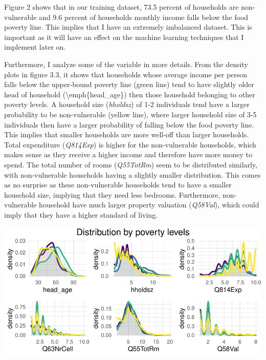 \documentclass[11pt,preprint, authoryear]{elsarticle}
\let\origfigure\figure
\let\endorigfigure\endfigure
\renewenvironment{figure}[1][2] {
    \expandafter\origfigure\expandafter[H]
} {
    \endorigfigure
}
\numberwithin{equation}{section}
\numberwithin{figure}{section}
\numberwithin{table}{section}
\begin{document}
Figure 2 shows that in our training dataset, 73.5 percent of households
are non-vulnerable and 9.6 percent of households monthly income falls
below the food poverty line. This implies that I have an extremely
imbalanced dataset. This is important as it will have an effect on the
machine learning techniques that I implement later on.

Furthermore, I analyze some of the variable in more details. From the
density plots in figure 3.3, it shows that households whose average
income per person falls below the upper-bound poverty line (green line)
tend to have slightly older head of household
(\textbackslash emph\{head\_age\}) then those household belonging to
other poverty levels. A household size (\emph{hholdsz}) of 1-2
individuals tend have a larger probability to be non-vulnerable (yellow
line), where larger household size of 3-5 individuals then have a larger
probability of falling below the food poverty line. This implies that
smaller households are more well-off than larger households. Total
expenditure (\emph{Q814Exp}) is higher for the non-vulnerable
households, which makes sense as they receive a higher income and
therefore have more money to spend. The total number of rooms
(\emph{Q55TotRm}) seem to be distributed similarly, with non-vulnerable
households having a slightly smaller distribution. This comes as no
surprise as these non-vulnerable households tend to have a smaller
household size, implying that they need less bedrooms. Furthermore,
non-vulnerable household have much larger property valuation
(\emph{Q58Val}), which could imply that they have a higher standard of
living.

\begin{figure}[H]

{\centering \includegraphics{Predicting-Poverty_files/figure-latex/Figure3-1} 

}

\caption{Distribution of certain variables by poverty level \label{Figure3}}\label{fig:Figure3}
\end{figure}
\end{document}
